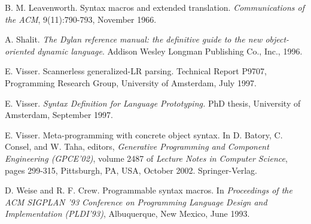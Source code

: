 \documentclass[a4paper,11pt]{article}
\begin{document}
\begin{thebibliography}{99}
B. M. Leavenworth. Syntax macros and extended translation. \emph{Communications
of the ACM}, 9(11):790-793, November 1966.

A. Shalit. \emph{The Dylan reference manual: the definitive guide
to the new object-oriented dynamic language}. Addison Wesley Longman Publishing
Co., Inc., 1996.

E. Visser. Scannerless generalized-LR parsing.
Technical Report P9707, Programming Research Group, University of Amsterdam, July 1997.

E. Visser. \emph{Syntax Definition for Language Prototyping.} PhD
thesis, University of Amsterdam, September 1997.

E. Visser. Meta-programming with concrete object syntax. In D. Batory,
C. Consel, and W. Taha, editors, \emph{Generative Programming and Component Engineering
(GPCE'02)}, volume 2487 of \emph{Lecture Notes in Computer Science}, pages 299-315, Pittsburgh,
PA, USA, October 2002. Springer-Verlag.

D. Weise and R. F. Crew. Programmable syntax macros. In \emph{Proceedings
of the ACM SIGPLAN '93 Conference on Programming Language Design and Implementation
(PLDI'93)}, Albuquerque, New Mexico, June 1993.

\end{thebibliography}
\end{document}
